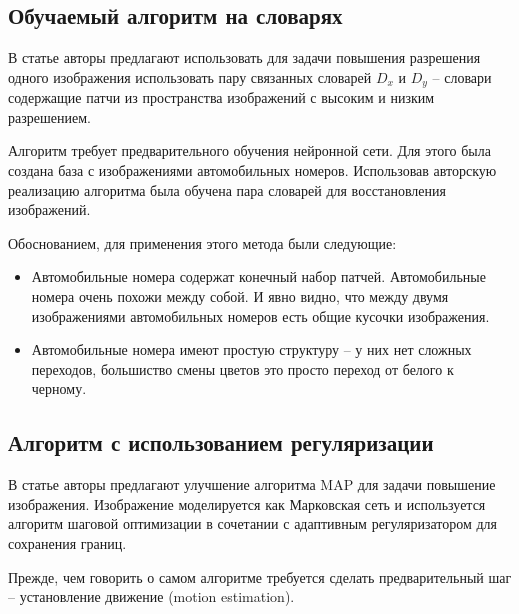 \subsection{Обучаемый алгоритм на словарях}
В статье \cite{yang2012coupled} авторы предлагают использовать для задачи повышения разрешения одного изображения
использовать пару связанных словарей $D_x$ и $D_y$ -- словари содержащие патчи из пространства изображений
с высоким и низким разрешением.

Алгоритм требует предварительного обучения нейронной сети. Для этого была создана база с изображениями автомобильных
номеров. Использовав авторскую реализацию алгоритма была обучена пара словарей для восстановления изображений.

Обоснованием, для применения этого метода были следующие:
\begin{itemize}
  \item Автомобильные номера содержат конечный набор патчей. Автомобильные номера очень похожи между собой. И явно
    видно, что между двумя изображениями автомобильных номеров есть общие кусочки изображения.
  \item Автомобильные номера имеют простую структуру -- у них нет сложных переходов, большиство смены цветов это просто
    переход от белого к черному.
\end{itemize}

\subsection{Алгоритм с использованием регуляризации}
В статье \cite{yuan2008fast} авторы предлагают улучшение алгоритма MAP для задачи повышение изображения. Изображение
моделируется как Марковская сеть и используется алгоритм шаговой оптимизации в сочетании с адаптивным
регуляризатором для сохранения границ.

Прежде, чем говорить о самом алгоритме требуется сделать предварительный шаг -- установление движение (motion
estimation). 

